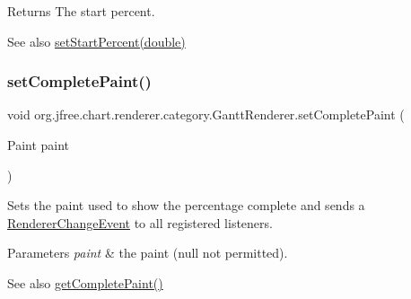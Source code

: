 \begin{DoxyReturn}{Returns}
The start percent.
\end{DoxyReturn}
\begin{DoxySeeAlso}{See also}
\mbox{\hyperlink{classorg_1_1jfree_1_1chart_1_1renderer_1_1category_1_1_gantt_renderer_a3541315737abffd6295be998a0c4d2b6}{set\+Start\+Percent(double)}} 
\end{DoxySeeAlso}
\mbox{\label{classorg_1_1jfree_1_1chart_1_1renderer_1_1category_1_1_gantt_renderer_a1c8e067f9e946aae2f936646c0334bd7}} 
\subsubsection{\texorpdfstring{set\+Complete\+Paint()}{setCompletePaint()}}
{\footnotesize\ttfamily void org.\+jfree.\+chart.\+renderer.\+category.\+Gantt\+Renderer.\+set\+Complete\+Paint (\begin{DoxyParamCaption}\item[{Paint}]{paint }\end{DoxyParamCaption})}

Sets the paint used to show the percentage complete and sends a \mbox{\hyperlink{}{Renderer\+Change\+Event}} to all registered listeners.


\begin{DoxyParams}{Parameters}
{\em paint} & the paint ({\ttfamily null} not permitted).\\
\hline
\end{DoxyParams}
\begin{DoxySeeAlso}{See also}
\mbox{\hyperlink{classorg_1_1jfree_1_1chart_1_1renderer_1_1category_1_1_gantt_renderer_ac6ee4267ce1266e2f84a574ac70991b5}{get\+Complete\+Paint()}} 
\end{DoxySeeAlso}
\mbox{\label{classorg_1_1jfree_1_1chart_1_1renderer_1_1category_1_1_gantt_renderer_a586fd9271c75caaebfb115052ba70fd4}} 
